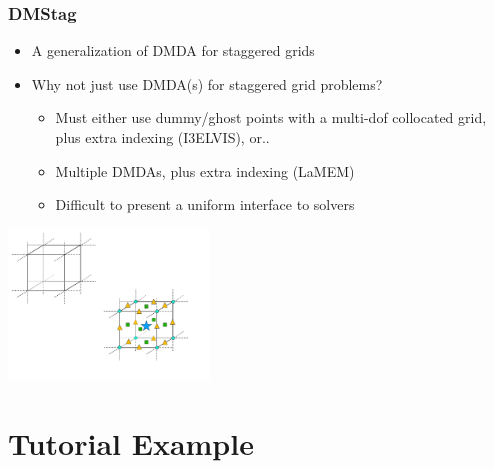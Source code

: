 \documentclass{beamer}
\begin{document}
\begin{frame}[fragile]
\frametitle{DMStag}
  \begin{itemize}
  \item A generalization of DMDA for staggered grids
  \item Why not just use DMDA(s) for staggered grid problems?
    \begin{itemize}
    \item Must either use dummy/ghost points with a multi-dof collocated grid,  plus extra indexing (I3ELVIS), or..
    \item Multiple DMDAs, plus extra indexing (LaMEM)
    \item Difficult to present a uniform interface to solvers
    \end{itemize}
  \end{itemize}
  \begin{center}
  \includegraphics[width=0.4\textwidth]{images/3d_grid_cartoon.pdf}
  \end{center}
\end{frame}

\section{Tutorial Example}
\end{document}
